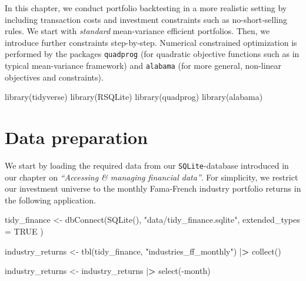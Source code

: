 \documentclass[
]{krantz}
\newenvironment{Shaded}{\begin{snugshade}}{\end{snugshade}}
\newcommand{\AttributeTok}[1]{\textcolor[rgb]{0.61,0.61,0.61}{#1}}
\newcommand{\ConstantTok}[1]{\textcolor[rgb]{0,0,0}{#1}}
\newcommand{\ErrorTok}[1]{\textcolor[rgb]{0.14,0.14,0.14}{\textbf{#1}}}
\newcommand{\FunctionTok}[1]{\textcolor[rgb]{0,0,0}{#1}}
\newcommand{\NormalTok}[1]{#1}
\newcommand{\OtherTok}[1]{\textcolor[rgb]{0.37,0.37,0.37}{#1}}
\newcommand{\SpecialCharTok}[1]{\textcolor[rgb]{0,0,0}{#1}}
\newcommand{\StringTok}[1]{\textcolor[rgb]{0.5,0.5,0.5}{#1}}
\begin{document}
In this chapter, we conduct portfolio backtesting in a more realistic setting by including transaction costs and investment constraints such as no-short-selling rules. We start with \emph{standard} mean-variance efficient portfolios. Then, we introduce further constraints step-by-step. Numerical constrained optimization is performed by the packages \texttt{quadprog} (for quadratic objective functions such as in typical mean-variance framework) and \texttt{alabama} (for more general, non-linear objectives and constraints).

\begin{Shaded}
\begin{Highlighting}[]
\FunctionTok{library}\NormalTok{(tidyverse)}
\FunctionTok{library}\NormalTok{(RSQLite)}
\FunctionTok{library}\NormalTok{(quadprog)}
\FunctionTok{library}\NormalTok{(alabama)}
\end{Highlighting}
\end{Shaded}

\hypertarget{data-preparation-7}{%
\section{Data preparation}\label{data-preparation-7}}

We start by loading the required data from our \texttt{SQLite}-database introduced in our chapter on \emph{``Accessing \& managing financial data''}. For simplicity, we restrict our investment universe to the monthly Fama-French industry portfolio returns in the following application.

\begin{Shaded}
\begin{Highlighting}[]
\NormalTok{tidy\_finance }\OtherTok{\textless{}{-}} \FunctionTok{dbConnect}\NormalTok{(}\FunctionTok{SQLite}\NormalTok{(), }\StringTok{"data/tidy\_finance.sqlite"}\NormalTok{,}
  \AttributeTok{extended\_types =} \ConstantTok{TRUE}
\NormalTok{)}

\NormalTok{industry\_returns }\OtherTok{\textless{}{-}} \FunctionTok{tbl}\NormalTok{(tidy\_finance, }\StringTok{"industries\_ff\_monthly"}\NormalTok{) }\SpecialCharTok{|}\ErrorTok{\textgreater{}}
  \FunctionTok{collect}\NormalTok{()}

\NormalTok{industry\_returns }\OtherTok{\textless{}{-}}\NormalTok{ industry\_returns }\SpecialCharTok{|}\ErrorTok{\textgreater{}}
  \FunctionTok{select}\NormalTok{(}\SpecialCharTok{{-}}\NormalTok{month)}
\end{Highlighting}
\end{Shaded}
\end{document}
